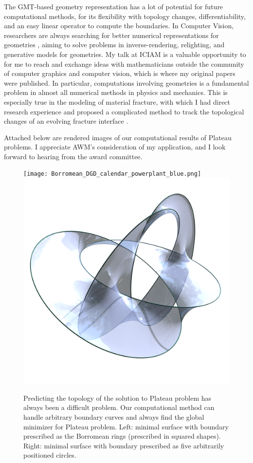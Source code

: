 \documentclass[12pt,a4paper]{article}
\begin{document}
The GMT-based geometry representation has a lot of potential for future computational methods, for its flexibility with topology changes, differentiability, and an easy linear operator to compute the boundaries.  
In Computer Vision, researchers are always searching for better numerical representations for geometries \cite{mildenhall2020nerf, takikawa2021nglod, meng2023neat}, aiming to solve problems in inverse-rendering, relighting, and generative models for geometries.  
My talk at ICIAM is a valuable opportunity to for me to reach and exchange ideas with mathematicians outside the community of computer graphics and computer vision, which is where my original papers were published. 
In particular, computations involving geometries is a fundamental problem in almost all numerical methods in physics and mechanics. 
This is especially true in the modeling of material fracture, with which I had direct research experience and proposed a complicated method to track the topological changes of an evolving fracture interface \cite{Wang:2019}. 


Attached below are rendered images of our computational results of Plateau problems. 
I appreciate AWM's consideration of my application, and I look forward to hearing from the award committee. 
\begin{figure}[h]
  \centering
    \texttt{[image: Borromean\_DGD\_calendar\_powerplant\_blue.png]}
    \includegraphics[width=0.4\linewidth]{DGD_calendar_collage_rings_surface.png}
    \caption{
      Predicting the topology of the solution to Plateau problem has always been a difficult problem. Our computational method can handle arbitrary boundary curves and always find the global minimizer for Plateau problem. Left: minimal surface with boundary prescribed as the Borromean rings (prescribed in squared shapes). Right: minimal surface with boundary prescribed as five arbitrarily positioned circles. 
    }
  \end{figure}



\end{document}
